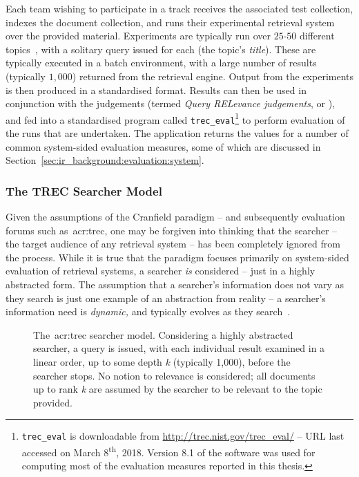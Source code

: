 Each team wishing to participate in a track receives the associated test collection, indexes the document collection, and runs their experimental retrieval system over the provided material. Experiments are typically run over $25$-$50$ different topics~\citep{voorhees2001iir_philosophy}, with a solitary query issued for each (the topic's \emph{title}). These are typically executed in a batch environment, with a large number of results (typically $1,000$) returned from the retrieval engine. Output from the experiments is then produced in a standardised format. Results can then be used in conjunction with the judgements (termed \emph{Query RELevance judgements}, or ), and fed into a standardised program called \texttt{trec\_eval}\footnote{\texttt{trec\_eval} is downloadable from \url{http://trec.nist.gov/trec_eval/} -- URL last accessed on March 8\textsuperscript{th}, 2018. Version 8.1 of the software was used for computing most of the evaluation measures reported in this thesis.} to perform evaluation of the runs that are undertaken. The application returns the values for a number of common system-sided evaluation measures, some of which are discussed in Section~\ref{sec:ir_background:evaluation:system}.

\subsubsection{The TREC Searcher Model}\label{sec:ir_background:paradigms:trec:model}
Given the assumptions of the Cranfield paradigm -- and subsequently evaluation forums such as~\gls{acr:trec}, one may be forgiven into thinking that the searcher -- the target audience of any retrieval system -- has been completely ignored from the process. While it is true that the paradigm focuses primarily on system-sided evaluation of retrieval systems, a searcher \emph{is} considered -- just in a highly abstracted form. The assumption that a searcher's information does not vary as they search is just one example of an abstraction from reality -- a searcher's information need is \emph{dynamic,} and typically evolves as they search~\citep{borlund2003iir_model}.

\begin{figure}[t!]
    \centering
    \caption[\gls{acr:trec} searcher model]{The~\gls{acr:trec} searcher model. Considering a highly abstracted searcher, a query is issued, with each individual result examined in a linear order, up to some depth \emph{k} (typically 1,000), before the searcher stops. No notion to relevance is considered; all documents up to rank \emph{k} are assumed by the searcher to be relevant to the topic provided.}
    \label{fig:trec_model}
\end{figure}

